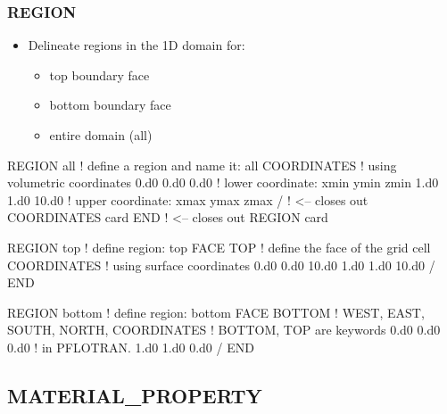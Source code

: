 \documentclass{beamer}
\newcommand\redcomment[1]{{{\color{red} #1}}}
\newcommand\bluecomment[1]{{{\color{blue} #1}}}
\newcommand\greencomment[1]{{{\color{green} #1}}}
\begin{document}
\begin{frame}\frametitle{REGION}

\begin{itemize}
  \item Delineate regions in the 1D domain for:
  \begin{itemize}
    \item top boundary face
    \item bottom boundary face
    \item entire domain (all)
  \end{itemize}
\end{itemize}

\begin{semiverbatim}
REGION all            \bluecomment{! define a region and name it: \greencomment{all}}
  COORDINATES         \bluecomment{! using \redcomment{volumetric} coordinates}
    0.d0 0.d0 0.d0    \bluecomment{! lower coordinate: xmin ymin zmin}
    1.d0 1.d0 10.d0   \bluecomment{! upper coordinate: xmax ymax zmax}
  /   \bluecomment{! <-- closes out COORDINATES card}
END   \bluecomment{! <-- closes out REGION card}

\newpage
REGION top            \bluecomment{! define region:} \greencomment{top}
  FACE TOP            \bluecomment{! define the face of the grid cell}
  COORDINATES         \bluecomment{! using \redcomment{surface} coordinates}
    0.d0 0.d0 10.d0
    1.d0 1.d0 10.d0
  /
END

REGION bottom         \bluecomment{! define region:} \greencomment{bottom}
  FACE BOTTOM         \redcomment{! WEST, EAST, SOUTH, NORTH,}
  COORDINATES         \redcomment{!   BOTTOM, TOP} \bluecomment{ are keywords}
    0.d0 0.d0 0.d0    \bluecomment{!   in PFLOTRAN.}
    1.d0 1.d0 0.d0
  /
END

\end{semiverbatim}

\end{frame}

\subsection{MATERIAL\_PROPERTY}
\end{document}
